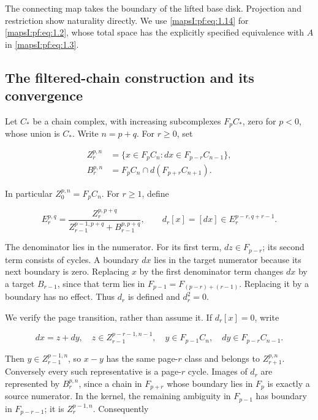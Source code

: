 The connecting map takes the boundary of the lifted base disk. Projection and restriction show naturality directly. We use \eqref{mapsI:pf:eq:1.14} for \eqref{mapsI:pf:eq:1.2}, whose total space has the explicitly specified equivalence with \(A\) in \eqref{mapsI:pf:eq:1.3}.

\subsection{The filtered-chain construction and its convergence}
\label{mapsI:pf:filtered-chains}

Let \(C_*\) be a chain complex, with increasing subcomplexes \(F_pC_*\), zero for \(p<0\), whose union is \(C_*\). Write \(n=p+q\). For \(r\geq0\), set

\begin{equation}
\begin{aligned}
Z_r^{p,n}&=\{x\in F_pC_n:dx\in F_{p-r}C_{n-1}\},\\
B_r^{p,n}&=F_pC_n\cap d(F_{p+r}C_{n+1}).
\end{aligned}
\label{mapsI:pf:eq:2.1}
\end{equation}

In particular \(Z_0^{p,n}=F_pC_n\). For \(r\geq1\), define

\begin{equation}
E_r^{p,q}=
\frac{Z_r^{p,p+q}}
{Z_{r-1}^{p-1,p+q}+B_{r-1}^{p,p+q}},
\qquad
d_r[x]=[dx]\in E_r^{p-r,q+r-1}.
\label{mapsI:pf:eq:2.2}
\end{equation}

The denominator lies in the numerator. For its first term, \(dz\in F_{p-r}\); its second term consists of cycles. A boundary \(dx\) lies in the target numerator because its next boundary is zero. Replacing \(x\) by the first denominator term changes \(dx\) by a target \(B_{r-1}\), since that term lies in \(F_{p-1}=F_{(p-r)+(r-1)}\). Replacing it by a boundary has no effect. Thus \(d_r\) is defined and \(d_r^2=0\).

We verify the page transition, rather than assume it. If \(d_r[x]=0\), write

\begin{equation}
dx=z+dy,\quad
z\in Z_{r-1}^{p-r-1,n-1},\quad
y\in F_{p-1}C_n,\quad dy\in F_{p-r}C_{n-1}.
\label{mapsI:pf:eq:2.3}
\end{equation}

Then \(y\in Z_{r-1}^{p-1,n}\), so \(x-y\) has the same page-\(r\) class and belongs to \(Z_{r+1}^{p,n}\). Conversely every such representative is a page-\(r\) cycle. Images of \(d_r\) are represented by \(B_r^{p,n}\), since a chain in \(F_{p+r}\) whose boundary lies in \(F_p\) is exactly a source numerator. In the kernel, the remaining ambiguity in \(F_{p-1}\) has boundary in \(F_{p-r-1}\); it is \(Z_r^{p-1,n}\). Consequently

